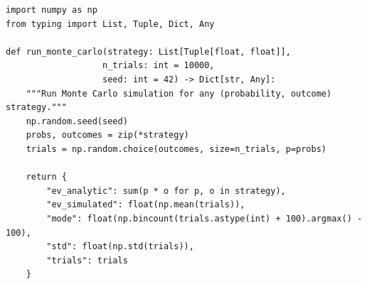 \documentclass[11pt,a4paper]{article}
\begin{document}
\begin{lstlisting}[style=mypython, caption={Reusable Monte Carlo engine}, label={lst:simulation}]
import numpy as np
from typing import List, Tuple, Dict, Any

def run_monte_carlo(strategy: List[Tuple[float, float]], 
                   n_trials: int = 10000,
                   seed: int = 42) -> Dict[str, Any]:
    """Run Monte Carlo simulation for any (probability, outcome) strategy."""
    np.random.seed(seed)
    probs, outcomes = zip(*strategy)
    trials = np.random.choice(outcomes, size=n_trials, p=probs)
    
    return {
        "ev_analytic": sum(p * o for p, o in strategy),
        "ev_simulated": float(np.mean(trials)),
        "mode": float(np.bincount(trials.astype(int) + 100).argmax() - 100),
        "std": float(np.std(trials)),
        "trials": trials
    }
\end{lstlisting}
\end{document}
